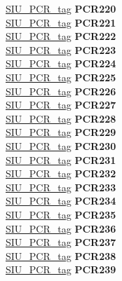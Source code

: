\begin{DoxyCompactItemize}
\begin{tabbing}
\>\>\mbox{\hyperlink{unionSIU__tag_1_1SIU__PCR__tag}{SIU\_PCR\_tag}} {\bfseries PCR220}\\
\>\>\mbox{\hyperlink{unionSIU__tag_1_1SIU__PCR__tag}{SIU\_PCR\_tag}} {\bfseries PCR221}\\
\>\>\mbox{\hyperlink{unionSIU__tag_1_1SIU__PCR__tag}{SIU\_PCR\_tag}} {\bfseries PCR222}\\
\>\>\mbox{\hyperlink{unionSIU__tag_1_1SIU__PCR__tag}{SIU\_PCR\_tag}} {\bfseries PCR223}\\
\>\>\mbox{\hyperlink{unionSIU__tag_1_1SIU__PCR__tag}{SIU\_PCR\_tag}} {\bfseries PCR224}\\
\>\>\mbox{\hyperlink{unionSIU__tag_1_1SIU__PCR__tag}{SIU\_PCR\_tag}} {\bfseries PCR225}\\
\>\>\mbox{\hyperlink{unionSIU__tag_1_1SIU__PCR__tag}{SIU\_PCR\_tag}} {\bfseries PCR226}\\
\>\>\mbox{\hyperlink{unionSIU__tag_1_1SIU__PCR__tag}{SIU\_PCR\_tag}} {\bfseries PCR227}\\
\>\>\mbox{\hyperlink{unionSIU__tag_1_1SIU__PCR__tag}{SIU\_PCR\_tag}} {\bfseries PCR228}\\
\>\>\mbox{\hyperlink{unionSIU__tag_1_1SIU__PCR__tag}{SIU\_PCR\_tag}} {\bfseries PCR229}\\
\>\>\mbox{\hyperlink{unionSIU__tag_1_1SIU__PCR__tag}{SIU\_PCR\_tag}} {\bfseries PCR230}\\
\>\>\mbox{\hyperlink{unionSIU__tag_1_1SIU__PCR__tag}{SIU\_PCR\_tag}} {\bfseries PCR231}\\
\>\>\mbox{\hyperlink{unionSIU__tag_1_1SIU__PCR__tag}{SIU\_PCR\_tag}} {\bfseries PCR232}\\
\>\>\mbox{\hyperlink{unionSIU__tag_1_1SIU__PCR__tag}{SIU\_PCR\_tag}} {\bfseries PCR233}\\
\>\>\mbox{\hyperlink{unionSIU__tag_1_1SIU__PCR__tag}{SIU\_PCR\_tag}} {\bfseries PCR234}\\
\>\>\mbox{\hyperlink{unionSIU__tag_1_1SIU__PCR__tag}{SIU\_PCR\_tag}} {\bfseries PCR235}\\
\>\>\mbox{\hyperlink{unionSIU__tag_1_1SIU__PCR__tag}{SIU\_PCR\_tag}} {\bfseries PCR236}\\
\>\>\mbox{\hyperlink{unionSIU__tag_1_1SIU__PCR__tag}{SIU\_PCR\_tag}} {\bfseries PCR237}\\
\>\>\mbox{\hyperlink{unionSIU__tag_1_1SIU__PCR__tag}{SIU\_PCR\_tag}} {\bfseries PCR238}\\
\>\>\mbox{\hyperlink{unionSIU__tag_1_1SIU__PCR__tag}{SIU\_PCR\_tag}} {\bfseries PCR239}\\

\end{tabbing}
\end{DoxyCompactItemize}
